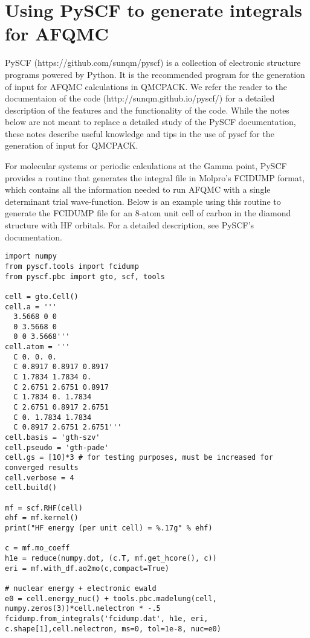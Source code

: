 \section{Using PySCF to generate integrals for AFQMC}
\label{sec:pyscf}

PySCF (https://github.com/sunqm/pyscf) is a collection of electronic structure programs powered by Python. It is the recommended program for the generation of input for AFQMC calculations in QMCPACK. We refer the reader to the documentaion of the code (http://sunqm.github.io/pyscf/) for a detailed description of the features and the functionality of the code. While the notes below are not meant to replace a detailed study of the PySCF documentation, these notes describe useful knowledge and tips in the use of pyscf for the generation of input for QMCPACK. 

For molecular systems or periodic calculations at the Gamma point, PySCF provides a routine that generates the integral file in Molpro's FCIDUMP format, which contains all the information needed to run AFQMC with a single determinant trial wave-function. Below is an example using this routine to generate the FCIDUMP file for an 8-atom unit cell of carbon in the diamond structure with HF orbitals. For a detailed description, see PySCF's documentation.  
\begin{lstlisting}[caption=Simple example showing how to generate FCIDUMP files with PySCF]
import numpy
from pyscf.tools import fcidump
from pyscf.pbc import gto, scf, tools

cell = gto.Cell()
cell.a = '''
  3.5668 0 0
  0 3.5668 0
  0 0 3.5668'''
cell.atom = '''
  C 0. 0. 0. 
  C 0.8917 0.8917 0.8917
  C 1.7834 1.7834 0. 
  C 2.6751 2.6751 0.8917
  C 1.7834 0. 1.7834
  C 2.6751 0.8917 2.6751
  C 0. 1.7834 1.7834
  C 0.8917 2.6751 2.6751'''
cell.basis = 'gth-szv'
cell.pseudo = 'gth-pade'
cell.gs = [10]*3 # for testing purposes, must be increased for converged results 
cell.verbose = 4
cell.build()

mf = scf.RHF(cell)
ehf = mf.kernel()
print("HF energy (per unit cell) = %.17g" % ehf) 

c = mf.mo_coeff
h1e = reduce(numpy.dot, (c.T, mf.get_hcore(), c))
eri = mf.with_df.ao2mo(c,compact=True)

# nuclear energy + electronic ewald 
e0 = cell.energy_nuc() + tools.pbc.madelung(cell, numpy.zeros(3))*cell.nelectron * -.5
fcidump.from_integrals('fcidump.dat', h1e, eri, c.shape[1],cell.nelectron, ms=0, tol=1e-8, nuc=e0)
\end{lstlisting}

